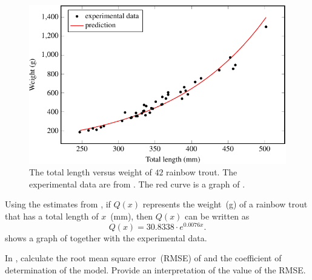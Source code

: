 \documentclass[a4paper,oneside,12pt]{article}
\begin{document}
\begin{solution}
\begin{figure}[!htbp]
\centering
\includegraphics[scale=1.1]{image/12/rainbow-trout.pdf}
\caption{%
  The total length versus weight of $42$ rainbow trout.  The
  experimental data are from .  The
  red curve is a graph of
  .
}
\label{fig:rainbow_trout_prediction}
\end{figure}

Using the estimates
from , if $Q(x)$
represents the weight~(g) of a rainbow trout that has a total length
of $x$~(mm), then $Q(x)$ can be written as
\begin{equation}
\label{eqn:logarithm:rainbow_trout_prediction}
Q(x)
=
30.8338 \cdot e^{0.0076 x}.
\end{equation}
 shows a graph of
 together with the
experimental data.
\end{solution}

\begin{exercise}
In , calculate the root mean
square error~(RMSE) of
 and the coefficient
of determination of the model.  Provide an interpretation of the value
of the RMSE.
\end{exercise}

\end{document}
